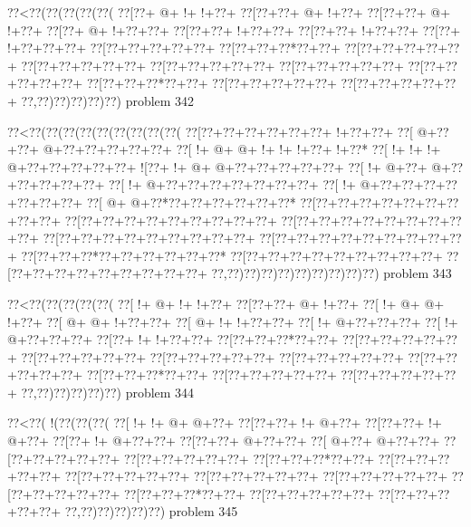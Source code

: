 \vbox{\vbox{\goo
\0??<\0??(\0??(\0??(\0??(\0??(
\0??[\0??+\- @+\- !+\- !+\0??+
\0??[\0??+\0??+\- @+\- !+\0??+
\0??[\0??+\0??+\- @+\- !+\0??+
\0??[\0??+\- @+\- !+\0??+\0??+
\0??[\0??+\0??+\- !+\0??+\0??+
\0??[\0??+\0??+\- !+\0??+\0??+
\0??[\0??+\- !+\0??+\0??+\0??+
\0??[\0??+\0??+\0??+\0??+\0??+
\0??[\0??+\0??+\0??*\0??+\0??+
\0??[\0??+\0??+\0??+\0??+\0??+
\0??[\0??+\0??+\0??+\0??+\0??+
\0??[\0??+\0??+\0??+\0??+\0??+
\0??[\0??+\0??+\0??+\0??+\0??+
\0??[\0??+\0??+\0??+\0??+\0??+
\0??[\0??+\0??+\0??*\0??+\0??+
\0??[\0??+\0??+\0??+\0??+\0??+
\0??[\0??+\0??+\0??+\0??+\0??+
\0??,\0??)\0??)\0??)\0??)\0??)
}
\hfil problem 342\hfil\break
}

\vbox{\vbox{\goo
\0??<\0??(\0??(\0??(\0??(\0??(\0??(\0??(\0??(\0??(
\0??[\0??+\0??+\0??+\0??+\0??+\0??+\- !+\0??+\0??+
\0??[\- @+\0??+\0??+\- @+\0??+\0??+\0??+\0??+\0??+
\0??[\- !+\- @+\- @+\- !+\- !+\- !+\0??+\- !+\0??*
\0??[\- !+\- !+\- !+\- @+\0??+\0??+\0??+\0??+\0??+
\- ![\0??+\- !+\- @+\- @+\0??+\0??+\0??+\0??+\0??+
\0??[\- !+\- @+\0??+\- @+\0??+\0??+\0??+\0??+\0??+
\0??[\- !+\- @+\0??+\0??+\0??+\0??+\0??+\0??+\0??+
\0??[\- !+\- @+\0??+\0??+\0??+\0??+\0??+\0??+\0??+
\0??[\- @+\- @+\0??*\0??+\0??+\0??+\0??+\0??+\0??*
\0??[\0??+\0??+\0??+\0??+\0??+\0??+\0??+\0??+\0??+
\0??[\0??+\0??+\0??+\0??+\0??+\0??+\0??+\0??+\0??+
\0??[\0??+\0??+\0??+\0??+\0??+\0??+\0??+\0??+\0??+
\0??[\0??+\0??+\0??+\0??+\0??+\0??+\0??+\0??+\0??+
\0??[\0??+\0??+\0??+\0??+\0??+\0??+\0??+\0??+\0??+
\0??[\0??+\0??+\0??*\0??+\0??+\0??+\0??+\0??+\0??*
\0??[\0??+\0??+\0??+\0??+\0??+\0??+\0??+\0??+\0??+
\0??[\0??+\0??+\0??+\0??+\0??+\0??+\0??+\0??+\0??+
\0??,\0??)\0??)\0??)\0??)\0??)\0??)\0??)\0??)\0??)
}
\hfil problem 343\hfil\break
}

\vbox{\vbox{\goo
\0??<\0??(\0??(\0??(\0??(\0??(
\0??[\- !+\- @+\- !+\- !+\0??+
\0??[\0??+\0??+\- @+\- !+\0??+
\0??[\- !+\- @+\- @+\- !+\0??+
\0??[\- @+\- @+\- !+\0??+\0??+
\0??[\- @+\- !+\- !+\0??+\0??+
\0??[\- !+\- @+\0??+\0??+\0??+
\0??[\- !+\- @+\0??+\0??+\0??+
\0??[\0??+\- !+\- !+\0??+\0??+
\0??[\0??+\0??+\0??*\0??+\0??+
\0??[\0??+\0??+\0??+\0??+\0??+
\0??[\0??+\0??+\0??+\0??+\0??+
\0??[\0??+\0??+\0??+\0??+\0??+
\0??[\0??+\0??+\0??+\0??+\0??+
\0??[\0??+\0??+\0??+\0??+\0??+
\0??[\0??+\0??+\0??*\0??+\0??+
\0??[\0??+\0??+\0??+\0??+\0??+
\0??[\0??+\0??+\0??+\0??+\0??+
\0??,\0??)\0??)\0??)\0??)\0??)
}
\hfil problem 344\hfil\break
}

\vbox{\vbox{\goo
\0??<\0??(\- !(\0??(\0??(\0??(
\0??[\- !+\- !+\- @+\- @+\0??+
\0??[\0??+\0??+\- !+\- @+\0??+
\0??[\0??+\0??+\- !+\- @+\0??+
\0??[\0??+\- !+\- @+\0??+\0??+
\0??[\0??+\0??+\- @+\0??+\0??+
\0??[\- @+\0??+\- @+\0??+\0??+
\0??[\0??+\0??+\0??+\0??+\0??+
\0??[\0??+\0??+\0??+\0??+\0??+
\0??[\0??+\0??+\0??*\0??+\0??+
\0??[\0??+\0??+\0??+\0??+\0??+
\0??[\0??+\0??+\0??+\0??+\0??+
\0??[\0??+\0??+\0??+\0??+\0??+
\0??[\0??+\0??+\0??+\0??+\0??+
\0??[\0??+\0??+\0??+\0??+\0??+
\0??[\0??+\0??+\0??*\0??+\0??+
\0??[\0??+\0??+\0??+\0??+\0??+
\0??[\0??+\0??+\0??+\0??+\0??+
\0??,\0??)\0??)\0??)\0??)\0??)
}
\hfil problem 345\hfil\break
}

